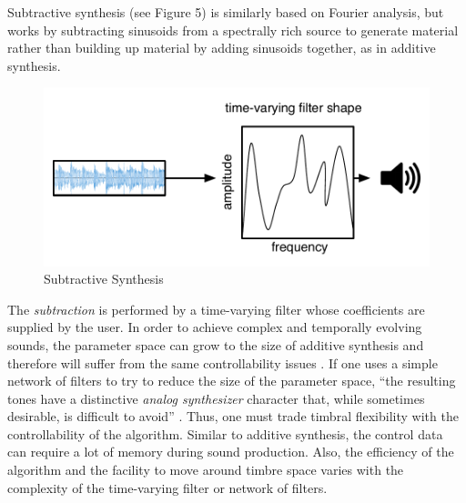 \documentclass[12pt]{report} 	%
\numberwithin{figure}{chapter}
\numberwithin{table}{chapter}
\numberwithin{equation}{chapter}
\begin{document}
\begin{flushleft}
Subtractive synthesis (see Figure 5) is similarly based on Fourier analysis, but works by subtracting sinusoids from a spectrally rich source to generate material rather than building up material by adding sinusoids together, as in additive synthesis. 
\begin{figure}[h!]
\vspace{12pt}
\begin{center}
\includegraphics[scale=0.8]{SubtractiveSynthesis}
\caption[Subtractive synthesis]{Subtractive Synthesis}
\end{center}
\vspace{6pt}
\end{figure}
The \textit{subtraction} is performed by a time-varying filter whose coefficients are supplied by the user. In order to achieve complex and temporally evolving sounds, the parameter space can grow to the size of additive synthesis and therefore will suffer from the same controllability issues \cite[p. 48]{Tolonen:1998bh}. If one uses a simple network of filters to try to reduce the size of the parameter space, ``the resulting tones have a distinctive \textit{analog synthesizer} character that, while sometimes desirable, is difficult to avoid'' \cite[p. 5]{Vercoe:1998hh}. Thus, one must trade timbral flexibility with the controllability of the algorithm. Similar to additive synthesis, the control data can require a lot of memory during sound production. Also, the efficiency of the algorithm and the facility to move around timbre space varies with the complexity of the time-varying filter or network of filters.


\end{flushleft}
\end{document}
